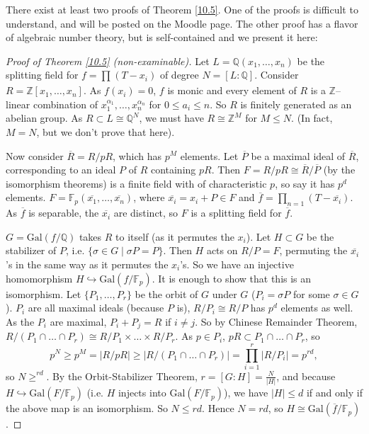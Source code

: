 \documentclass{article}
\theoremstyle{definition}
\begin{document}
There exist at least two proofs of Theorem \ref{10.5}. One of the proofs is difficult to understand, and will be posted on the Moodle page. The other proof has a flavor of algebraic number theory, but is self-contained and we present it here:
\begin{proof}[Proof of Theorem \ref{10.5} (non-examinable)]
    Let $L=\mathbb{Q}(x_1,\ldots,x_n)$ be the splitting field for $f = \prod_{}^{} (T-x_i)$ of degree $N=[L:\mathbb{Q}]$. Consider $R = \mathbb{Z}[x_1,\ldots,x_n]$. As $f(x_i)=0$, $f$ is monic and every element of $R$ is a $\mathbb{Z}$--linear combination of $x_1^{\alpha_1},\ldots,x_n^{\alpha_n}$ for $0\le a_i\le n$. So $R$ is finitely generated as an abelian group. As $R \subset L \cong \mathbb{Q}^N$, we must have $R \cong \mathbb{Z}^M$ for $M\le N$. (In fact, $M=N$, but we don't prove that here).
    \vspace{1mm}

    Now consider $\overline{R}=R/pR$, which has $p^M$ elements. Let $\overline{P}$ be a maximal ideal of $\overline{R}$, corresponding to an ideal $P$ of $R$ containing $pR$. Then $F = R/pR \cong \overline{R}/\overline{P}$ (by the isomorphism theorems) is a finite field with of characteristic $p$, so say it has $p^d$ elements. $F = \mathbb{F}_p(\overline{x_1},\ldots,\overline{x_n})$, where $\overline{x_i}=x_i+P \in F$ and $\overline{f}=\prod_{n=1}^{} (T-\overline{x_i})$. As $\overline{f}$ is separable, the $\overline{x_i}$ are distinct, so $F$ is a splitting field for $\overline{f}$.
    \vspace{1mm}

    $G = \text{Gal}(f/\mathbb{Q})$ takes $R$ to itself (as it permutes the $x_i$). Let $H \subset G$ be the stabilizer of $P$, i.e. $\{\sigma \in G \mid \sigma P = P\}$. Then $H$ acts on $R/P = F$, permuting the $\overline{x_i}$'s in the same way as it permutes the $x_i$'s. So we have an injective homomorphism $H \hookrightarrow \text{Gal}(f/\mathbb{F}_p)$. It is enough to show that this is an isomorphism. Let $\{P_1,\ldots,P_r\}$ be the orbit of $G$ under $G$ ($P_i= \sigma P$ for some $\sigma \in G$). $P_i$ are all maximal ideals (because $P$ is), $R/P_i \cong R/P$ has $p^d$ elements as well. As the $P_i$ are maximal, $P_i+P_j = R$ if $i\neq j$. So by Chinese Remainder Theorem, $R/(P_1 \cap \ldots \cap P_r) \cong R/P_1 \times \ldots \times R/P_r$. As $p \in P_i$, $pR \subset P_1 \cap \ldots \cap P_r$, so \[
    p^N \ge p^M = |R/pR| \ge |R/(P_1 \cap \ldots \cap P_r)| = \prod_{i=1}^{r} |R/P_i| = p^{rd},
    \]
    so $N \ge ^{rd}$. By the Orbit-Stabilizer Theorem, $r=[G:H] = \frac{N}{|H|}$, and because $H \hookrightarrow \text{Gal}(F/\mathbb{F}_p)$ (i.e. $H$ injects into $\text{Gal}(F/\mathbb{F}_p)$), we have $|H|\le d$ if and only if the above map is an isomorphism. So $N\le rd$. Hence $N=rd$, so $H \cong \text{Gal}(\overline{f}/\mathbb{F}_p)$.
\end{proof}
\end{document}
